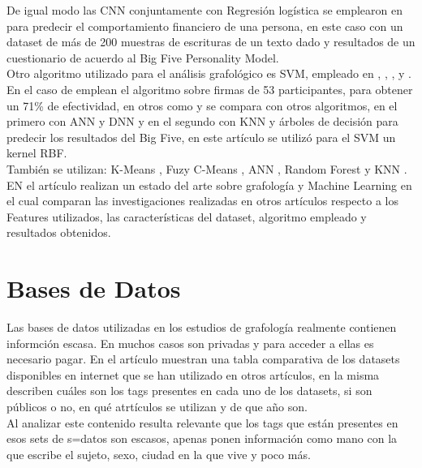 \documentclass[10pt, a4paper]{article}
\begin{document}
De igual modo las CNN conjuntamente con Regresi\'on log\'istica se emplearon en \cite{4} para predecir el comportamiento financiero de una persona, en este caso con un dataset de más de 200 muestras de escrituras de un texto dado y resultados de un cuestionario de acuerdo al Big Five Personality Model.\\ 

Otro algoritmo utilizado para el an\'alisis grafol\'ogico es SVM, empleado en \cite{2}, \cite{5}, \cite{6}, \cite{7} y \cite{8}. En el caso de \cite{6} emplean el algoritmo sobre firmas de 53 participantes, para obtener un 71\% de efectividad, 
en otros como \cite{5} y \cite{8} se compara con otros algoritmos, en el primero con ANN y DNN y en el segundo con KNN y \'arboles de decisi\'on para predecir los resultados del Big Five, en este art\'iculo se utiliz\'o para el SVM un kernel RBF.\\ 

Tambi\'en se utilizan: K-Means \cite{9}, Fuzy C-Means \cite{10}, ANN \cite{11,5,12,9}, Random Forest \cite{13, 14} y KNN \cite{14,9,8}.\\

EN el art\'iculo \cite{18} realizan un estado del arte sobre grafolog\'ia y Machine Learning en el cual comparan las investigaciones realizadas en 
otros art\'iculos respecto a los Features utilizados, las caracter\'isticas del dataset, algoritmo empleado y resultados obtenidos.

\section{Bases de Datos}

Las bases de datos utilizadas en los estudios de grafolog\'ia realmente contienen informci\'on escasa. En muchos casos 
son privadas y para acceder a ellas es necesario pagar. En el art\'iculo \cite{14} muestran una tabla comparativa de los datasets disponibles en 
internet que se han utilizado en otros art\'iculos, en la misma describen cu\'ales son los tags presentes en cada uno de los datasets, si son p\'ublicos o no, en qu\'e atrt\'iculos se utilizan y 
de que a\~no son. \\ 

Al analizar este contenido resulta relevante que los tags que est\'an presentes en esos sets de s=datos son escasos, apenas ponen informaci\'on como mano con la que escribe el sujeto, sexo, 
ciudad en la que vive y poco m\'as. \\ 
\end{document}
